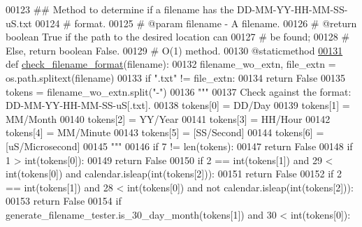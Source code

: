 \begin{DoxyCode}
00123     \textcolor{comment}{##  Method to determine if a filename has the DD-MM-YY-HH-MM-SS-uS.txt}
00124     \textcolor{comment}{#       format.}
00125     \textcolor{comment}{#   @param filename - A filename.}
00126     \textcolor{comment}{#   @return boolean True if the path to the desired location can}
00127     \textcolor{comment}{#       be found;}
00128     \textcolor{comment}{#       Else, return boolean False.}
00129     \textcolor{comment}{#   O(1) method.}
00130     @staticmethod
\hypertarget{miscellaneous_8py_source_l00131}{}\hyperlink{classutilities_1_1miscellaneous_1_1misc_a96b7b4aa054c6c8eb7571314ec8edbc7}{00131}     \textcolor{keyword}{def }\hyperlink{classutilities_1_1miscellaneous_1_1misc_a96b7b4aa054c6c8eb7571314ec8edbc7}{check\_filename\_format}(filename):
00132         filename\_wo\_extn, file\_extn = os.path.splitext(filename)
00133         \textcolor{keywordflow}{if} \textcolor{stringliteral}{".txt"} != file\_extn:
00134             \textcolor{keywordflow}{return} \textcolor{keyword}{False}
00135         tokens = filename\_wo\_extn.split(\textcolor{stringliteral}{"-"})
00136         \textcolor{stringliteral}{"""}
00137 \textcolor{stringliteral}{            Check against the format: DD-MM-YY-HH-MM-SS-uS[.txt].}
00138 \textcolor{stringliteral}{            tokens[0] = DD/Day}
00139 \textcolor{stringliteral}{            tokens[1] = MM/Month}
00140 \textcolor{stringliteral}{            tokens[2] = YY/Year}
00141 \textcolor{stringliteral}{            tokens[3] = HH/Hour}
00142 \textcolor{stringliteral}{            tokens[4] = MM/Minute}
00143 \textcolor{stringliteral}{            tokens[5] = [SS/Second]}
00144 \textcolor{stringliteral}{            tokens[6] = [uS/Microsecond]}
00145 \textcolor{stringliteral}{        """}
00146         \textcolor{keywordflow}{if} 7 != len(tokens):
00147             \textcolor{keywordflow}{return} \textcolor{keyword}{False}
00148         \textcolor{keywordflow}{if} 1 > int(tokens[0]):
00149             \textcolor{keywordflow}{return} \textcolor{keyword}{False}
00150         \textcolor{keywordflow}{if} 2 == int(tokens[1]) \textcolor{keywordflow}{and} 29 < int(tokens[0]) \textcolor{keywordflow}{and} calendar.isleap(int(tokens[2])):
00151             \textcolor{keywordflow}{return} \textcolor{keyword}{False}
00152         \textcolor{keywordflow}{if} 2 == int(tokens[1]) \textcolor{keywordflow}{and} 28 < int(tokens[0]) \textcolor{keywordflow}{and} \textcolor{keywordflow}{not} calendar.isleap(int(tokens[2])):
00153             \textcolor{keywordflow}{return} \textcolor{keyword}{False}
00154         \textcolor{keywordflow}{if} generate\_filename\_tester.is\_30\_day\_month(tokens[1]) \textcolor{keywordflow}{and} 30 < int(tokens[0]):

\end{DoxyCode}

